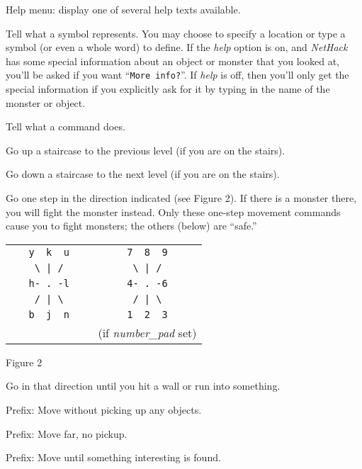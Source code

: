 \blist{}
\item[\tb{?}]
Help menu:  display one of several help texts available.
\item[\tb{/}]
Tell what a symbol represents.  You may choose to specify a location
or type a symbol (or even a whole word) to define.  If the
{\it help\/}
option is on, and {\it NetHack\/} has some special information about an object or
monster that you looked at, you'll be asked if you want ``{\tt More
info?}''.
If {\it help\/} is off, then you'll only get the special information if you
explicitly ask for it by typing in the name of the monster or object.
\item[\tb{\&}]
Tell what a command does.
\item[\tb{<}]
Go up a staircase to the previous level (if you are on the stairs).
\item[\tb{>}]
Go down a staircase to the next level (if you are on the stairs).
\item[\tb{[yuhjklbn]}]
Go one step in the direction indicated (see Figure 2).  If there is
a monster there, you will fight the monster instead.  Only these
one-step movement commands cause you to fight monsters; the others
(below) are ``safe.''
\begin{center}
\begin{tabular}{cc}
\verb+   y  k  u   + & \verb+   7  8  9   +\\
\verb+    \ | /    + & \verb+    \ | /    +\\
\verb+   h- . -l   + & \verb+   4- . -6   +\\
\verb+    / | \    + & \verb+    / | \    +\\
\verb+   b  j  n   + & \verb+   1  2  3   +\\
                     & (if {\it number\_pad\/} set)
\end{tabular}
\end{center}
\begin{center}
Figure 2
\end{center}
\item[\tb{[YUHJKLBN]}]
Go in that direction until you hit a wall or run into something.
\item[\tb{m[yuhjklbn]}]
Prefix:  Move without picking up any objects.
\item[\tb{M[yuhjklbn]}]
Prefix:  Move far, no pickup.
\item[\tb{g[yuhjklbn]}]
Prefix:  Move until something interesting is found.
\item[\tb{G[yuhjklbn] or <CONTROL->[yuhjklbn]}]
